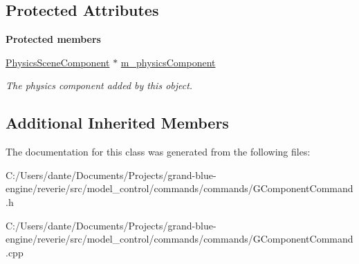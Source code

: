 \subsection*{Protected Attributes}
\begin{Indent}\textbf{ Protected members}\par
\begin{DoxyCompactItemize}
\item 
\mbox{\label{classrev_1_1_add_physics_scene_command_ac031561c8a615eb42e75a4c269045dd4}} 
\mbox{\hyperlink{classrev_1_1_physics_scene_component}{Physics\+Scene\+Component}} $\ast$ \mbox{\hyperlink{classrev_1_1_add_physics_scene_command_ac031561c8a615eb42e75a4c269045dd4}{m\+\_\+physics\+Component}}
\begin{DoxyCompactList}\small\item\em The physics component added by this object. \end{DoxyCompactList}\end{DoxyCompactItemize}
\end{Indent}
\subsection*{Additional Inherited Members}


The documentation for this class was generated from the following files\+:\begin{DoxyCompactItemize}
\item 
C\+:/\+Users/dante/\+Documents/\+Projects/grand-\/blue-\/engine/reverie/src/model\+\_\+control/commands/commands/G\+Component\+Command.\+h\item 
C\+:/\+Users/dante/\+Documents/\+Projects/grand-\/blue-\/engine/reverie/src/model\+\_\+control/commands/commands/G\+Component\+Command.\+cpp\end{DoxyCompactItemize}
